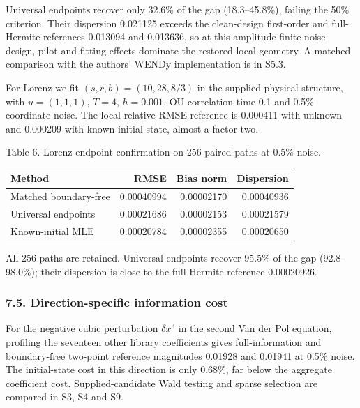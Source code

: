 \documentclass[
  american,
  11pt,
]{article}
\begin{document}
Universal endpoints recover only 32.6\% of the gap (18.3--45.8\%),
failing the 50\% criterion. Their dispersion 0.021125 exceeds the
clean-design first-order and full-Hermite references 0.013094 and
0.013636, so at this amplitude finite-noise design, pilot and fitting
effects dominate the restored local geometry. A matched comparison with
the authors' WENDy implementation is in S5.3.

For Lorenz we fit \((s,r,b)=(10,28,8/3)\) in the supplied physical
structure, with \(u=(1,1,1)\), \(T=4\), \(h=0.001\), OU correlation time
0.1 and 0.5\% coordinate noise. The local relative RMSE reference is
0.000411 with unknown and 0.000209 with known initial state, almost a
factor two.

\begin{center}
\begin{minipage}{\linewidth}
Table 6. Lorenz endpoint confirmation on 256 paired paths at 0.5\%
noise.

\small\setlength{\tabcolsep}{3pt}
\begin{tabular}{@{}lrrr@{}}
\toprule\noalign{}
Method & RMSE & Bias norm & Dispersion \\
\midrule\noalign{}
Matched boundary-free & 0.00040994 & 0.00002170 & 0.00040936 \\
Universal endpoints & 0.00021686 & 0.00002153 & 0.00021579 \\
Known-initial MLE & 0.00020784 & 0.00002355 & 0.00020650 \\
\bottomrule
\end{tabular}
\end{minipage}
\end{center}

All 256 paths are retained. Universal endpoints recover 95.5\% of the
gap (92.8--98.0\%); their dispersion is close to the full-Hermite
reference 0.00020926.

\subsubsection{7.5. Direction-specific information
cost}\label{direction-specific-information-cost}

For the negative cubic perturbation \(\delta x^3\) in the second Van der
Pol equation, profiling the seventeen other library coefficients gives
full-information and boundary-free two-point reference magnitudes
0.01928 and 0.01941 at 0.5\% noise. The initial-state cost in this
direction is only 0.68\%, far below the aggregate coefficient cost.
Supplied-candidate Wald testing and sparse selection are compared in S3,
S4 and S9.
\end{document}
